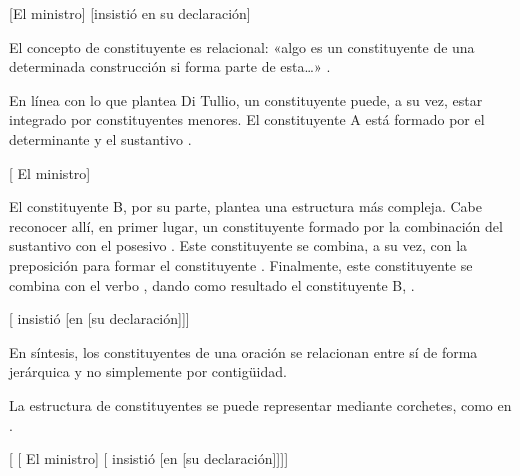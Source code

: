 \begin{exe}
  \ex\label{ex:05-AB} {}[El ministro] [insistió en su declaración]
\end{exe}

\begin{destacado}
El concepto de constituyente es relacional: «algo es un constituyente de una
determinada construcción si forma parte de esta\ldots{}»
\parencite[69]{ditullio2014}.
\end{destacado}

En línea con lo que plantea Di Tullio, un constituyente puede, a su vez, estar
integrado por constituyentes menores. El constituyente A está formado por el
determinante  y el sustantivo .

\begin{exe}
  \ex {}[ El ministro]
\end{exe}

El constituyente B, por su parte, plantea una estructura más compleja. Cabe
reconocer allí, en primer lugar, un constituyente formado por la combinación del
sustantivo  con el posesivo . Este constituyente se
combina, a su vez, con la preposición  para formar el constituyente
. Finalmente, este constituyente se combina con el verbo
, dando como resultado el constituyente B, .

\begin{exe}
  \ex {}[ insistió [en [su declaración]]]
\end{exe}

\begin{destacado}
En síntesis, los constituyentes de una oración se relacionan entre sí de forma
jerárquica y no simplemente por contigüidad.
\end{destacado}

La estructura de constituyentes se puede representar mediante corchetes, como en
.

\begin{exe}
  \ex\label{ex:05-corchetes} {}[ [ El ministro] [ insistió
      [en [su declaración]]]]
\end{exe}

